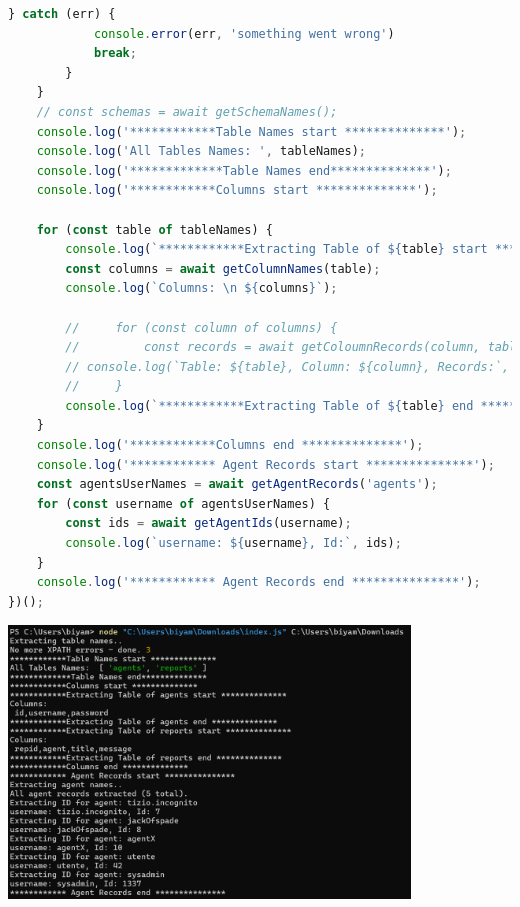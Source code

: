 \documentclass[12pt]{article}
\begin{document}
\begin{lstlisting}[language=JavaScript, label={lst:sql-js}]
        } catch (err) {
            console.error(err, 'something went wrong')
            break;
        }
    }
    // const schemas = await getSchemaNames();
    console.log('************Table Names start **************');
    console.log('All Tables Names: ', tableNames);
    console.log('*************Table Names end**************');
    console.log('************Columns start **************');

    for (const table of tableNames) {
        console.log(`************Extracting Table of ${table} start **************`);
        const columns = await getColumnNames(table);
        console.log(`Columns: \n ${columns}`);

        //     for (const column of columns) {
        //         const records = await getColoumnRecords(column, table);
        // console.log(`Table: ${table}, Column: ${column}, Records:`, records);
        //     }
        console.log(`************Extracting Table of ${table} end **************`);
    }
    console.log('************Columns end **************');
    console.log('************ Agent Records start ***************');
    const agentsUserNames = await getAgentRecords('agents');
    for (const username of agentsUserNames) {
        const ids = await getAgentIds(username);
        console.log(`username: ${username}, Id:`, ids);
    }
    console.log('************ Agent Records end ***************');
})();
\end{lstlisting}

\begin{center}
\includegraphics[width=0.8\textwidth]{script.png}
\end{center}

\\

\hrulefill
\end{document}
